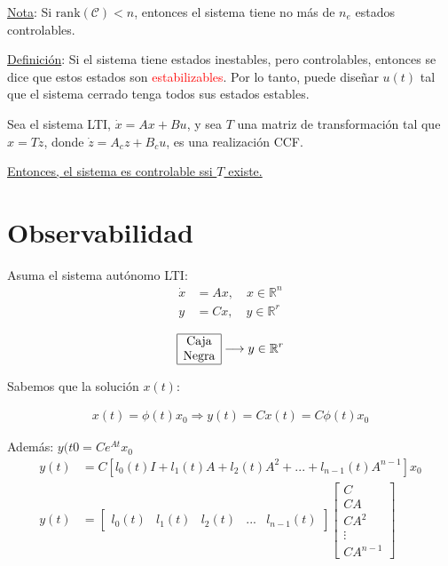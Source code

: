 \underline{Nota}: Si $\text{rank}(\mathcal{C})<n$, entonces el sistema tiene no más de $n_e$ estados controlables.\\
\par \underline{Definición}: Si el sistema tiene estados inestables, pero controlables, entonces se dice que estos estados son \textcolor{red}{estabilizables}. Por lo tanto, puede diseñar $u(t)$ tal que el sistema cerrado tenga todos sus estados estables.\\
\par Sea el sistema LTI, $\dot{x}=Ax+Bu$, y sea $T$ una matriz de transformación tal que $x=Tz$, donde $\dot{z}=A_cz+B_cu$, es una realización CCF.\\
\par \underline{Entonces, el sistema es controlable ssi $T$ existe.}

\section{Observabilidad}
Asuma el sistema autónomo LTI:
\begin{align*}
    \dot{x} &= Ax, \quad x\in\mathbb{R}^n\\
    y &= Cx, \quad y\in\mathbb{R}^r
\end{align*}

\begin{align*}
    \begin{array} {|c|}
  \hline \text{Caja}\\ 
  \text{Negra} \\
  \hline 
\end{array} \longrightarrow y\in\mathbb{R}^r
\end{align*}

Sabemos que la solución $x(t)$: 

\begin{align*}
    x(t) = \phi (t) x_0 \Longrightarrow y(t) = C x(t) = C \phi (t) x_0
\end{align*}

Además: $y(t0=Ce^{At}x_0$
\begin{align*}
    y(t) &= C\left[l_0(t)I+l_1(t)A+l_2(t)A^2+...+l_{n-1}(t)A^{n-1} \right]x_0\\
    y(t) &= \left[
    \begin{array}{c|c|c|c|c}
     l_0(t) & l_1(t) & l_2(t) & ... & l_{n-1}(t)
    \end{array}\right] \left[
    \begin{array}{c}
     C\\ \hline CA \\ \hline CA^2 \\ \hline \vdots \\ \hline CA^{n-1} 
    \end{array}\right]
\end{align*}

